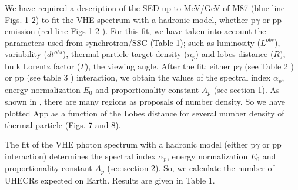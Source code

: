 \documentclass[preprint, twocolumn,secnumarabic,amssymb, nobibnotes, aps, prd]{revtex4-1}
\begin{document}
We have required a description of the SED up to MeV/GeV of  M87 \cite{fra12a} (blue line Figs. 1-2) to fit the VHE spectrum with a hadronic model, whether p$\gamma$ or pp emission (red line Figs 1-2 ).  For this fit, we have taken into account the parameters used from  synchrotron/SSC (Table 1); such as luminosity ($L^{obs}$), variability ($dt^{obs}$),  thermal particle target density ($n_p$) and lobes distance ($R$)\citep{abd10, der09,  har09, rom96}, bulk Lorentz factor ($\Gamma$), the viewing angle. After the fit;  either p$\gamma$ (see Table 2 ) or pp  (see table 3 ) interaction, we obtain   the values of  the spectral index $\alpha_p$,  energy normalization $E_0$ and proportionality constant $A_p$ (see section 1).  
As  shown in \cite{you02,mat08a,mat08b, sal08, hin89}, there are many regions as proposals of number density.  So we have plotted App as a function of the Lobes distance for several number density of  thermal particle (Figs. 7 and 8).




\noindent The fit of  the VHE photon spectrum with a hadronic model (either p$\gamma$ or pp interaction) determines the spectral index $\alpha_p$,  energy normalization $E_0$ and proportionality constant $A_p$ (see section 2). So, we calculate the number of  UHECRs expected on Earth. Results are given in Table 1. 
\end{document}

